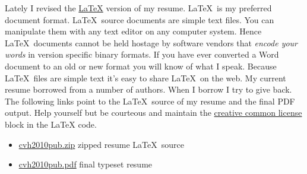 Lately I revised the \href{http://www.latex-project.org/}{\LaTeX} version
of my resume. \LaTeX\ is my preferred document format. \LaTeX\ source
documents are simple text files. You can manipulate them with any text
editor on any computer system. Hence \LaTeX\ documents cannot be held
hostage by software vendors that \emph{encode your words} in version
specific binary formats. If you have ever converted a Word document to
an old or new format you will know of what I speak. Because \LaTeX\ files
are simple text it's easy to share \LaTeX\ on the web. My current resume
borrowed from a number of authors. When I borrow I try to give back. The
following links point to the \LaTeX\ source of my resume and the final PDF
output. Help yourself but be courteous and maintain the
\href{http://creativecommons.org/licenses/by-nc-sa/1.0/}{creative common
license} block in the LaTeX code.

\begin{itemize}
\item
  \href{https://github.com/bakerjd99/jacks/blob/master/latex/cvh2010pub.zip}{cvh2010pub.zip} zipped
  resume \LaTeX\ source
\item
  \href{https://github.com/bakerjd99/jacks/blob/master/latex/cvh2010pub.pdf}{cvh2010pub.pdf} final
  typeset resume
\end{itemize}


%
